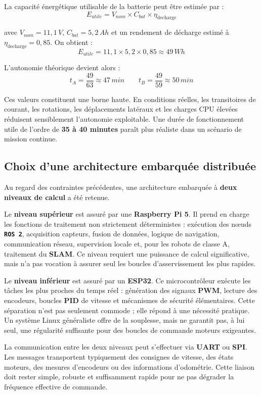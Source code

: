 \documentclass[11pt,a4paper]{report}
\newcommand{\kw}[1]{\textbf{#1}}
\newcommand{\outil}[1]{\textbf{\texttt{#1}}}
\begin{document}
La capacité énergétique utilisable de la batterie peut être estimée par :
\[
E_{utile} = V_{nom} \times C_{bat} \times \eta_{\mathrm{decharge}}
\]

avec \(V_{nom}=11{,}1\,V\), \(C_{bat}=5{,}2\,Ah\) et un rendement de décharge estimé à \(\eta_{\mathrm{decharge}}=0{,}85\). On obtient :
\[
E_{utile} = 11{,}1 \times 5{,}2 \times 0{,}85 \approx 49\,Wh
\]

L’autonomie théorique devient alors :
\[
t_A = \frac{49}{63} \approx 47\,min
\qquad
t_B = \frac{49}{59} \approx 50\,min
\]

Ces valeurs constituent une borne haute. En conditions réelles, les transitoires de courant, les rotations, les déplacements latéraux et les charges CPU élevées réduisent sensiblement l’autonomie exploitable. Une durée de fonctionnement utile de l’ordre de \kw{35 à 40 minutes} paraît plus réaliste dans un scénario de mission continue.

\subsection{Choix d'une architecture embarquée distribuée}

Au regard des contraintes précédentes, une architecture embarquée à \kw{deux niveaux de calcul} a été retenue.

Le \kw{niveau supérieur} est assuré par une \kw{Raspberry Pi 5}. Il prend en charge les fonctions de traitement non strictement déterministes : exécution des nœuds \outil{ROS 2}, acquisition capteurs, fusion de données, logique de navigation, communication réseau, supervision locale et, pour les robots de classe A, traitement du \kw{SLAM}. Ce niveau requiert une puissance de calcul significative, mais n’a pas vocation à assurer seul les boucles d’asservissement les plus rapides.

Le \kw{niveau inférieur} est assuré par un \kw{ESP32}. Ce microcontrôleur exécute les tâches les plus proches du temps réel : génération des signaux \kw{PWM}, lecture des encodeurs, boucles \kw{PID} de vitesse et mécanismes de sécurité élémentaires. Cette séparation n’est pas seulement commode ; elle répond à une nécessité pratique. Un système Linux généraliste offre de la souplesse, mais ne garantit pas, à lui seul, une régularité suffisante pour des boucles de commande moteurs exigeantes.

La communication entre les deux niveaux peut s’effectuer via \kw{UART} ou \kw{SPI}. Les messages transportent typiquement des consignes de vitesse, des états moteurs, des mesures d’encodeurs ou des informations d’odométrie. Cette liaison doit rester simple, robuste et suffisamment rapide pour ne pas dégrader la fréquence effective de commande.
\end{document}
